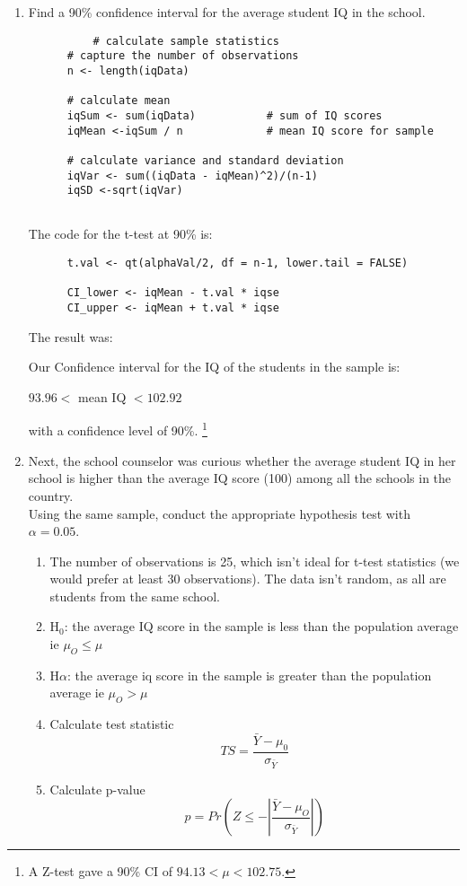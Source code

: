 \documentclass[12pt,letterpaper]{article}
\begin{document}
	\begin{enumerate}
		\item Find a 90\% confidence interval for the average student IQ in the school.\\
		
		  \begin{verbatim}
		  # calculate sample statistics
      # capture the number of observations 
      n <- length(iqData)

      # calculate mean
      iqSum <- sum(iqData)           # sum of IQ scores
      iqMean <-iqSum / n             # mean IQ score for sample

      # calculate variance and standard deviation
      iqVar <- sum((iqData - iqMean)^2)/(n-1) 
      iqSD <-sqrt(iqVar)            
      
		  \end{verbatim}
      
      The code for the t-test at 90\% is:
      
      \begin{verbatim}
      t.val <- qt(alphaVal/2, df = n-1, lower.tail = FALSE)

      CI_lower <- iqMean - t.val * iqse 
      CI_upper <- iqMean + t.val * iqse 

      \end{verbatim}
      The result was:
      
      Our Confidence interval for the IQ of the students in the sample is: 
       
       $93.96 <$ mean IQ $< 102.92$ 
       
       with a confidence level of 90\%.
       \footnote{A Z-test gave a  90\% CI of $94.13 < \mu < 102.75$.}
      
      
		\item Next, the school counselor was curious  whether  the average student IQ in her school is higher than the average IQ score (100) among all the schools in the country.\\ 
		\noindent Using the same sample, conduct the appropriate hypothesis test with $\alpha=0.05$.
		
		\begin{enumerate}
		    \item The number of observations is 25, which isn't ideal for t-test statistics
		    (we would prefer at least 30 observations).  The data isn't random, as all are students from the same school.
		    
		    \item H$_0$: the average IQ score in the sample is less than the population average
		    ie $\mu_O \le \mu$
		    \item H$\alpha$: the average iq score in the sample is greater than the population average  ie $\mu_O > \mu$
		    \item Calculate test statistic  \[TS = \frac{\bar{Y}  - \mu_0 }{\sigma_{\bar{Y}}}\]
		    \item  Calculate p-value \[p = Pr( Z \le - |\frac{\bar{Y}  - \mu_O }{\sigma_{\bar{Y}}} |)\]
		    

\end{enumerate}
\end{enumerate}
\end{document}
